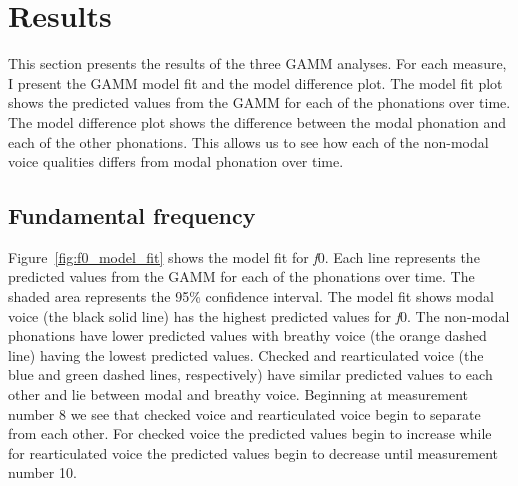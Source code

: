 \section{Results}\label{sec:results_of_lc}

This section presents the results of the three GAMM analyses. For each measure, I present the GAMM model fit and the model difference plot. The model fit plot shows the predicted values from the GAMM for each of the phonations over time. The model difference plot shows the difference between the modal phonation and each of the other phonations. This allows us to see how each of the non-modal voice qualities differs from modal phonation over time.
\subsection{Fundamental frequency} \label{sec:model_f0}

Figure~\ref{fig:f0_model_fit} shows the model fit for \textit{f}0. Each line represents the predicted values from the GAMM for each of the phonations over time. The shaded area represents the 95\% confidence interval. The model fit shows modal voice (the black solid line) has the highest predicted values for \textit{f}0. The non-modal phonations have lower predicted values with breathy voice (the orange dashed line) having the lowest predicted values. Checked and rearticulated voice (the blue and green dashed lines, respectively) have similar predicted values to each other and lie between modal and breathy voice. Beginning at measurement number 8 we see that checked voice and rearticulated voice begin to separate from each other. For checked voice the predicted values begin to increase while for rearticulated voice the predicted values begin to decrease until measurement number 10.

